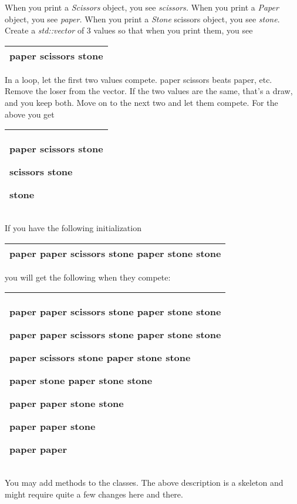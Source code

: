 \documentclass[
]{article}
\begin{document}
When you print a \emph{Scissors} object, you see \emph{scissors. }When
you print a \emph{Paper} object, you see \emph{paper. }When you print a
\emph{Stone} scissors object, you see \emph{stone}. Create a
\emph{std::vector} of 3 values so that when you print them, you see

\begin{longtable}[]{@{}l@{}}
\toprule
\endhead
paper scissors stone\tabularnewline
\bottomrule
\end{longtable}

In a loop, let the first two values compete. paper scissors beats paper,
etc. Remove the loser from the vector. If the two values are the same,
that's a draw, and you keep both. Move on to the next two and let them
compete. For the above you get

\begin{longtable}[]{@{}l@{}}
\toprule
\endhead
\begin{minipage}[t]{0.97\columnwidth}\raggedright
paper scissors stone

scissors stone

stone\strut
\end{minipage}\tabularnewline
\bottomrule
\end{longtable}

If you have the following initialization

\begin{longtable}[]{@{}l@{}}
\toprule
\endhead
paper paper scissors stone paper stone stone\tabularnewline
\bottomrule
\end{longtable}

you will get the following when they compete:

\begin{longtable}[]{@{}l@{}}
\toprule
\endhead
\begin{minipage}[t]{0.97\columnwidth}\raggedright
paper paper scissors stone paper stone stone

paper paper scissors stone paper stone stone

paper scissors stone paper stone stone

paper stone paper stone stone

paper paper stone stone

paper paper stone

paper paper\strut
\end{minipage}\tabularnewline
\bottomrule
\end{longtable}

You may add methods to the classes. The above description is a skeleton
and might require quite a few changes here and there.
\end{document}
